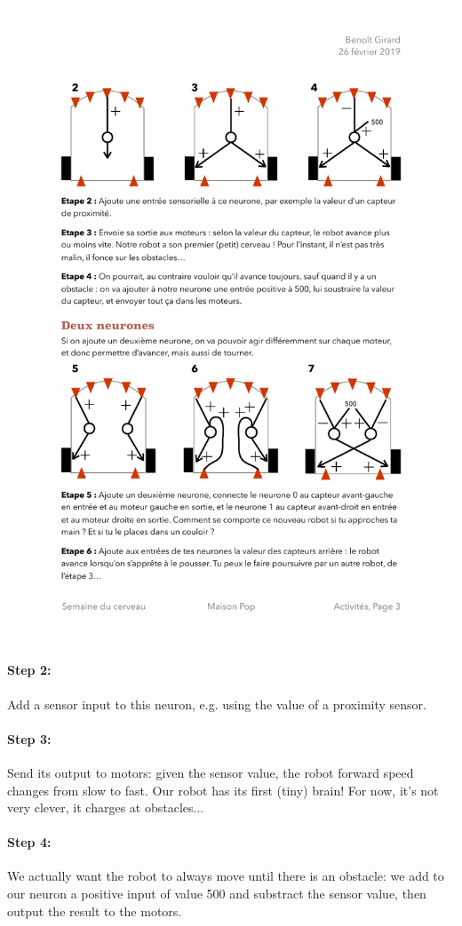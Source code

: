 \documentclass[12pt]{article}
\begin{document}
\includegraphics{../Etapes2-4.pdf}

\paragraph{Step 2:} Add a sensor input to this neuron, e.g. using the value of a proximity sensor.

\paragraph{Step 3:} Send its output to motors: given the sensor value, the robot forward speed changes from slow to fast. Our robot has its first (tiny) brain! For now, it's not very clever, it charges at obstacles...

\paragraph{Step 4:} We actually want the robot to always move until there is an obstacle: we add to our neuron a positive input of value 500 and substract the sensor value, then output the result to the motors.
\end{document}
